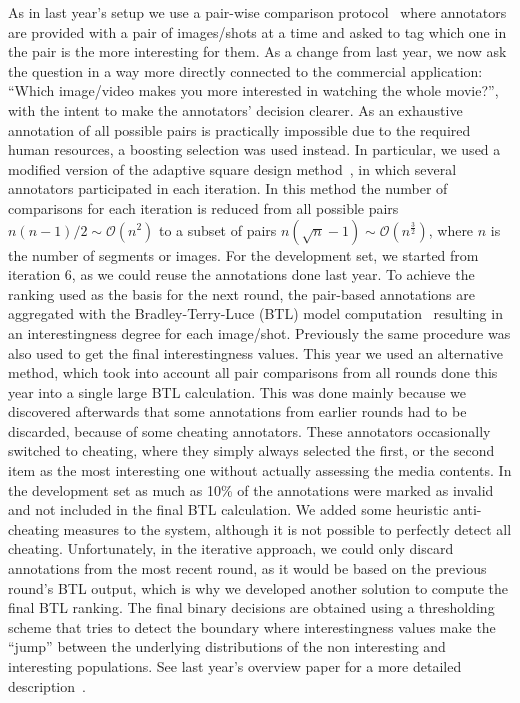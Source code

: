 \documentclass[sigconf]{acmart-me}
\begin{document}

As in last year's setup we use a pair-wise comparison protocol~\cite{Bradley} where annotators are provided with a pair of images/shots at a time and asked to tag which one in the pair is the more interesting for them.
As a change from last year, we now ask the question in a way more directly connected to the commercial application: ``Which image/video makes you more interested in watching the whole movie?'', with the intent to make the annotators' decision clearer.
As an exhaustive annotation of all possible pairs is practically impossible due to the required human resources, a boosting selection was used instead.
In particular, we used a modified version of the adaptive square design method~\cite{Li-SPIE2013}, in which several annotators participated in each iteration.  
In this method the number of comparisons for each iteration is reduced from all possible pairs $n(n-1)/2 \sim \mathcal{O}(n^2)$ to a subset of pairs $n(\sqrt{n}-1) \sim \mathcal{O}(n^{\frac{3}{2}})$, where $n$ is the number of segments or images.
For the development set, we started from iteration 6, as we could reuse the annotations done last year.
To achieve the ranking used as the basis for the next round, the pair-based annotations are aggregated with the Bradley-Terry-Luce (BTL) model computation~\cite{Bradley} resulting in an interestingness degree for each image/shot.
Previously the same procedure was also used to get the final interestingness values.
This year we used an alternative method, which took into account all pair comparisons from all rounds done this year into a single large BTL calculation.
This was done mainly because we discovered afterwards that some annotations from earlier rounds had to be discarded, because of some cheating annotators. %
These annotators occasionally switched to cheating, where they simply always selected the first, or the second item as the most interesting one without actually assessing the media contents.
In the development set as much as 10\% of the annotations were marked as invalid and not included in the final BTL calculation. We added some heuristic anti-cheating measures to the system, although it is not possible to perfectly detect all cheating.
Unfortunately, in the iterative approach, we could only discard annotations from the most recent round, as it would be based on the previous round's BTL output, which is why we developed another solution to compute the final BTL ranking.
The final binary decisions are obtained using a thresholding scheme that tries to detect the boundary where interestingness values make the ``jump'' between the underlying distributions of the non interesting and interesting populations.  See last year's overview paper for a more detailed description~\cite{demarty2016mediaeval}.
\end{document}
